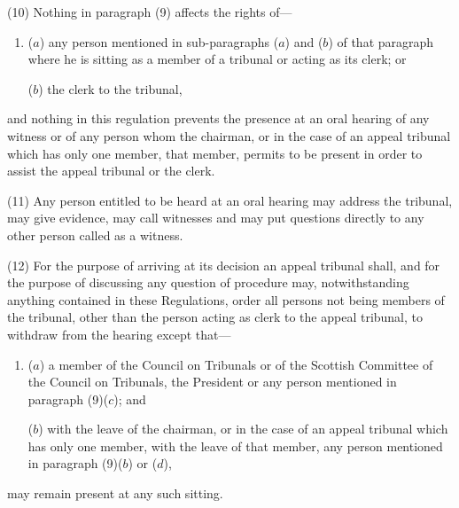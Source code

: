 \documentclass[12pt,a4paper]{article}
\begin{document}

(10) Nothing in paragraph (9) affects the rights of—
\begin{enumerate}\item[]
($a$) any person mentioned in sub-paragraphs ($a$)  and ($b$)  of that paragraph where he is sitting as a member of a tribunal or acting as its clerk; or

($b$) the clerk to the tribunal,
\end{enumerate}
and nothing in this regulation prevents the presence at an oral hearing of any witness or of any person whom the chairman, or in the case of an appeal tribunal which has only one member, that member, permits to be present in order to assist the appeal tribunal or the clerk.

(11) Any person entitled to be heard at an oral hearing may address the tribunal, may give evidence, may call witnesses and may put questions directly to any other person called as a witness.

(12) For the purpose of arriving at its decision an appeal tribunal shall, and for the purpose of discussing any question of procedure may, notwithstanding anything contained in these Regulations, order all persons not being members of the tribunal, other than the person acting as clerk to the appeal tribunal, to withdraw from the hearing except that—
\begin{enumerate}\item[]
($a$) a member of the Council on Tribunals or of the Scottish Committee of the Council on Tribunals, the President or any person mentioned in paragraph (9)($c$); and

($b$) with the leave of the chairman, or in the case of an appeal tribunal which has only one member, with the leave of that member, any person mentioned in paragraph (9)($b$) or ($d$),
\end{enumerate}
may remain present at any such sitting.
\end{document}
